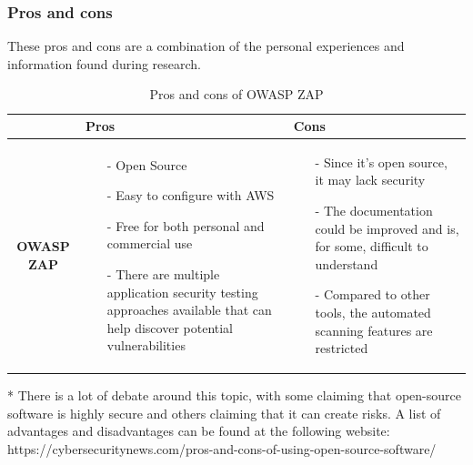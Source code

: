 \subsubsection{Pros and cons}
These pros and cons are a combination of the personal experiences and information found during research.\cite{prosconsZAP}
\begin{table}[H]
    \centering
    \begin{threeparttable}
        \begin{tabular}{|c|p{6cm}|p{6cm}|}
            \hline
             & \textbf{Pros} & \textbf{Cons} \\
            \hline
            \textbf{OWASP ZAP} &
            \begin{itemize}
                \item [-]Open Source
                \item [-]Easy to configure with AWS
                \item [-] Free for both personal and commercial use
                \item [-]There are multiple application security testing approaches available that can help discover potential vulnerabilities
            \end{itemize}
            & 
            \begin{itemize}
                \item [-] Since it's open source, it may lack security\tnote{*}
                \item [-] The documentation could be improved and is, for some, difficult to understand
                \item [-]Compared to other tools, the automated scanning features are restricted
            \end{itemize}
            \\
            \hline
        \end{tabular}
        \begin{tablenotes}
            \item[*] There is a lot of debate around this topic,  with some claiming that open-source software is highly secure and others claiming that it can create risks. A list of advantages and disadvantages can be found at the following website: https://cybersecuritynews.com/pros-and-cons-of-using-open-source-software/
            \caption{Pros and cons of OWASP ZAP}
        \end{tablenotes}
    \end{threeparttable}
\end{table}


